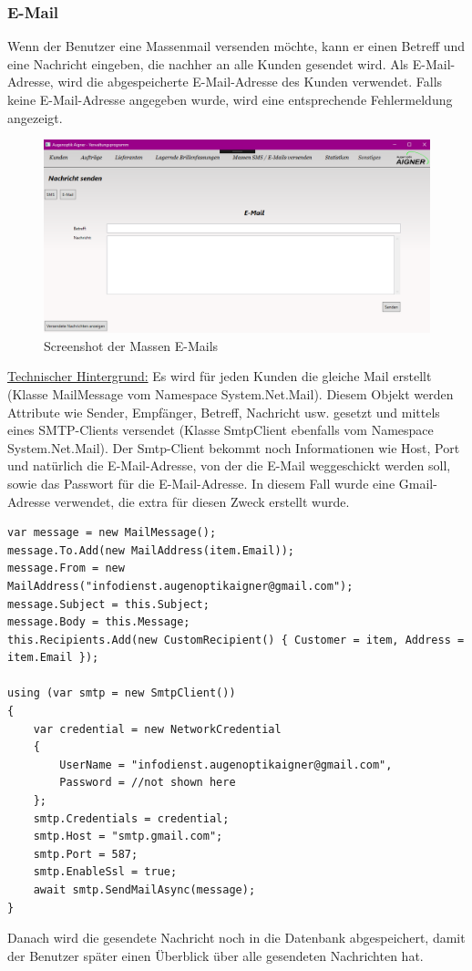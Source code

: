 \subsubsection{E-Mail}
Wenn der Benutzer eine Massenmail versenden möchte, kann er einen Betreff und eine Nachricht eingeben, die nachher an alle Kunden gesendet wird. Als E-Mail-Adresse, wird die abgespeicherte E-Mail-Adresse des Kunden verwendet. Falls keine E-Mail-Adresse angegeben wurde, wird eine entsprechende Fehlermeldung angezeigt.

\begin{figure}[H]
\begin{center}
	\includegraphics[scale=.45]{images/Massenemail.png}
\end{center}
	\caption{Screenshot der Massen E-Mails}
	\label{fig:sample}
\end{figure}
\noindent\underline{Technischer Hintergrund:}
\linebreak
Es wird für jeden Kunden die gleiche Mail erstellt (Klasse MailMessage vom Namespace System.Net.Mail). Diesem Objekt werden Attribute wie Sender, Empfänger, Betreff, Nachricht usw. gesetzt und mittels eines SMTP-Clients versendet (Klasse SmtpClient ebenfalls vom Namespace System.Net.Mail). Der Smtp-Client bekommt noch Informationen wie Host, Port und natürlich die E-Mail-Adresse, von der die E-Mail weggeschickt werden soll, sowie das Passwort für die E-Mail-Adresse. In diesem Fall wurde eine Gmail-Adresse verwendet, die extra für diesen Zweck erstellt wurde.

\begin{lstlisting}
var message = new MailMessage();
message.To.Add(new MailAddress(item.Email));
message.From = new MailAddress("infodienst.augenoptikaigner@gmail.com");
message.Subject = this.Subject;
message.Body = this.Message;
this.Recipients.Add(new CustomRecipient() { Customer = item, Address = item.Email });

using (var smtp = new SmtpClient())
{
	var credential = new NetworkCredential
	{
		UserName = "infodienst.augenoptikaigner@gmail.com",
		Password = //not shown here
	};
	smtp.Credentials = credential;
	smtp.Host = "smtp.gmail.com";
	smtp.Port = 587;
	smtp.EnableSsl = true;
	await smtp.SendMailAsync(message);
}       
\end{lstlisting}
\bigskip
Danach wird die gesendete Nachricht noch in die Datenbank abgespeichert, damit der Benutzer später einen Überblick über alle gesendeten Nachrichten hat.

